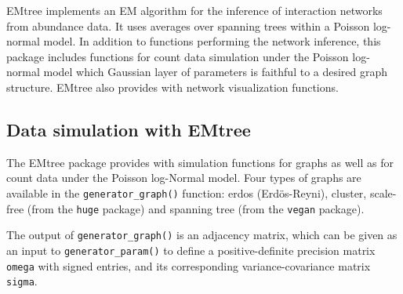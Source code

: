 EMtree implements an EM algorithm for the inference of interaction networks from abundance data. It uses averages over spanning trees within a Poisson log-normal model. In addition to functions performing the network inference, this package includes functions for count data simulation under the Poisson log-normal model which Gaussian layer of parameters is faithful to a desired graph structure. EMtree also provides with network visualization functions.


\subsection{\texorpdfstring{Data simulation with
EMtree}{Data simulation with EMtree}}\label{data-simulation-with-emtree}

The EMtree package provides with simulation functions for
graphs as well as for count data under the Poisson log-Normal model.
Four types of graphs are available in the \texttt{generator\_graph()}
function: erdos (Erdös-Reyni), cluster, scale-free (from the
\texttt{huge} package) and spanning tree (from the \texttt{vegan}
package).

\begin{Shaded}
\begin{Highlighting}[]
\NormalTok{,}\NormalTok{, }\NormalTok{)}
\NormalTok{,}\NormalTok{)}
\NormalTok{)}
\NormalTok{)}
\end{Highlighting}
\end{Shaded}

The output of \texttt{generator\_graph()} is an adjacency matrix, which
can be given as an input to \texttt{generator\_param()} to define a
positive-definite precision matrix \texttt{omega} with signed entries,
and its corresponding variance-covariance matrix \texttt{sigma}.

\begin{Shaded}
\begin{Highlighting}[]
 \NormalTok{)}
\end{Highlighting}
\end{Shaded}

